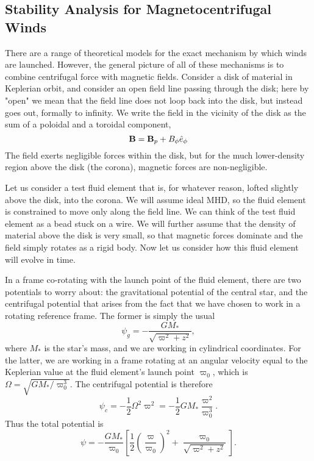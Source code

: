 \subsection{Stability Analysis for Magnetocentrifugal Winds}

There are a range of theoretical models for the exact mechanism by which winds are launched. However, the general picture of all of these mechanisms is to combine centrifugal force with magnetic fields. Consider a disk of material in Keplerian orbit, and consider an open field line passing through the disk; here by "open" we mean that the field line does not loop back into the disk, but instead goes out, formally to infinity. We write the field in the vicinity of the disk as the sum of a poloidal and a toroidal component,
\begin{equation}
\mathbf{B} = \mathbf{B}_p + B_\phi \hat{e}_\phi
\end{equation}
The field exerts negligible forces within the disk, but for the much lower-density region above the disk (the corona), magnetic forces are non-negligible.

Let us consider a test fluid element that is, for whatever reason, lofted slightly above the disk, into the corona. We will assume ideal MHD, so the fluid element is constrained to move only along the field line. We can think of the test fluid element as a bead stuck on a wire. We will further assume that the density of material above the disk is very small, so that magnetic forces dominate and the field simply rotates as a rigid body. Now let us consider how this fluid element will evolve in time.

In a frame co-rotating with the launch point of the fluid element, there are two potentials to worry about: the gravitational potential of the central star, and the centrifugal potential that arises from the fact that we have chosen to work in a rotating reference frame. The former is simply the usual
\begin{equation}
\psi_{g} = -\frac{GM_*}{\sqrt{\varpi^2 + z^2}},
\end{equation}
where $M_*$ is the star's mass, and we are working in cylindrical coordinates. For the latter, we are working in a frame rotating at an angular velocity equal to the Keplerian value at the fluid element's launch point $\varpi_0$, which is $\Omega = \sqrt{GM_*/\varpi_0^3}$. The centrifugal potential is therefore
\begin{equation}
\psi_c = -\frac{1}{2}\Omega^2 \varpi^2 = -\frac{1}{2} G M_* \frac{\varpi^2}{\varpi_0^3}.
\end{equation}
Thus the total potential is
\begin{equation}
\psi = -\frac{GM_*}{\varpi_0} \left[\frac{1}{2}\left(\frac{\varpi}{\varpi_0}\right)^2 + \frac{\varpi_0}{\sqrt{\varpi^2+z^2}} \right].
\end{equation}

